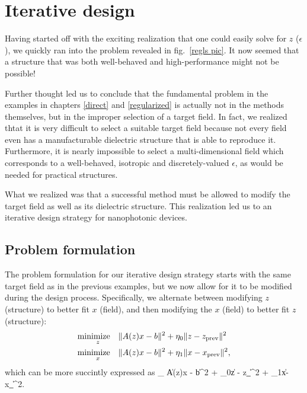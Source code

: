 \chapter{Iterative design} \label{iterative}
Having started off with the exciting realization that one could easily 
    solve for $z$ ($\epsilon$), we quickly ran into 
    the problem revealed in fig.~\ref{regls pic}.
It now seemed that a structure that was both well-behaved and high-performance
    might not be possible!

Further thought led us to conclude that
    the fundamental problem in the examples 
    in chapters \ref{direct} and \ref{regularized}
    is actually not in the methods themselves, 
    but in the improper selection of a target field. 
In fact, we realized thtat it is very difficult to select a suitable target field 
    because not every field even has a manufacturable dielectric structure 
    that is able to reproduce it. 
Furthermore, it is nearly impossible to select a multi-dimensional field 
    which corresponds to a well-behaved, isotropic and 
    discretely-valued $\epsilon$, 
    as would be needed for practical structures. 

What we realized was that a successful method 
    must be allowed to modify the target field as well as 
    its dielectric structure.
This realization led us to an iterative design strategy for nanophotonic devices.

\section{Problem formulation}
The problem formulation for our iterative design strategy
    starts with the same target field as in the previous examples,
    but we now allow for it to be modified during the design process. 
Specifically, we alternate between modifying $z$ (structure) 
    to better fit $x$ (field), 
    and then modifying the $x$ (field) to better fit $z$ (structure):
    \begin{subequations}\begin{align} 
    \operatorname*{\text{minimize}\quad}_z & \|A(z)x - b\|^2 + \eta_0\|z - z_\text{prev}\|^2 \\
    \operatorname*{\text{minimize}\quad}_x & \|A(z)x - b\|^2 + \eta_1\|x - x_\text{prev}\|^2,
    \end{align}\end{subequations}
which can be more succintly expressed as 
    \BE \minimize_ 
        \|A(z)x - b\|^2 + \eta_0\|z - z_\|^2
                        + \eta_1\|x-x_\|^2. \label{iterative problem}\EE


